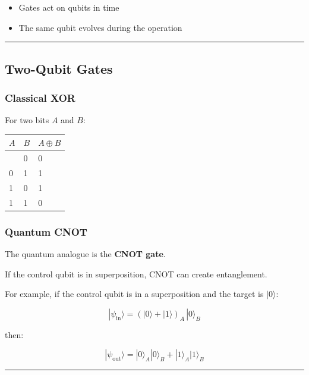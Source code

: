 \documentclass[
]{article}
\providecommand{\tightlist}{%
  \setlength{\itemsep}{0pt}\setlength{\parskip}{0pt}}
\begin{document}
\begin{itemize}
\tightlist
\item
  Gates act on qubits in time
\item
  The same qubit evolves during the operation
\end{itemize}

\begin{center}\rule{0.5\linewidth}{0.5pt}\end{center}

\subsection{Two-Qubit Gates}\label{two-qubit-gates}

\subsubsection{Classical XOR}\label{classical-xor}

For two bits $A$ and $B$:

\begin{longtable}[]{@{}lll@{}}
\toprule\noalign{}
$A$ & $B$ & $A \oplus B$ \\
\midrule\noalign{}
\endhead
\bottomrule\noalign{}
\endlastfoot
0 & 0 & 0 \\
0 & 1 & 1 \\
1 & 0 & 1 \\
1 & 1 & 0 \\
\end{longtable}

\subsubsection{Quantum CNOT}\label{quantum-cnot}

The quantum analogue is the \textbf{CNOT gate}.

If the control qubit is in superposition, CNOT can create entanglement.

For example, if the control qubit is in a superposition and the target
is $|0\rangle$:

\[
|\psi_{\mathrm{in}}\rangle = (|0\rangle + |1\rangle)_A\,|0\rangle_B
\]

then:

\[
|\psi_{\mathrm{out}}\rangle = |0\rangle_A|0\rangle_B + |1\rangle_A|1\rangle_B
\]

\begin{center}\rule{0.5\linewidth}{0.5pt}\end{center}
\end{document}
